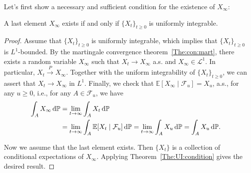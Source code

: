 Let's first show a necessary and sufficient condition for the existence of $X_\infty$:
\begin{proposition}
A last element $X_\infty$ exists if and only if $\{X_t\}_{t\ge0}$ is uniformly integrable.
\end{proposition}
\begin{proof}
Assume that $\{X_t\}_{t\ge0}$ is uniformly integrable, which implies that $\{X_t\}_{t\ge0}$ is $L^1$-bounded.
By the martingale convergence theorem~\ref{The:con:mart}, there exists a random variable $X_\infty$ such that $X_t\to X_\infty$ a.s. and $X_\infty\in\mathcal{L}^1$.
In particular, $X_t\xrightarrow{P} X_\infty$. Together with the uniform integrability of $\{X_t\}_{t\ge0}$, we can assert that $X_t\to X_\infty$ in $L^1$. %
Finally, we check that $\mathbb{E}[X_\infty\mid\mathcal{F}_u] = X_u$, a.s., for any $u\ge0$, i.e., for any $A\in\mathcal{F}_u$, we have
\begin{align*}
\int_AX_\infty\,\mathrm{d}\mathbb{P}&=\lim_{t\to\infty}\int_AX_t\,\mathrm{d}\mathbb{P}\\
&=\lim_{t\to\infty}\int_A\mathbb{E}[X_t\mid\mathcal{F}_u]\,\mathrm{d}\mathbb{P}
=\lim_{t\to\infty}\int_AX_u\,\mathrm{d}\mathbb{P}=\int_AX_u\,\mathrm{d}\mathbb{P}.
\end{align*}

Now we assume that the last element exists. 
Then $\{X_t\}$ is a collection of conditional expectations of $X_\infty$.
Applying Theorem~\ref{The:UI:condition} gives the desired result.
 


\end{proof}



